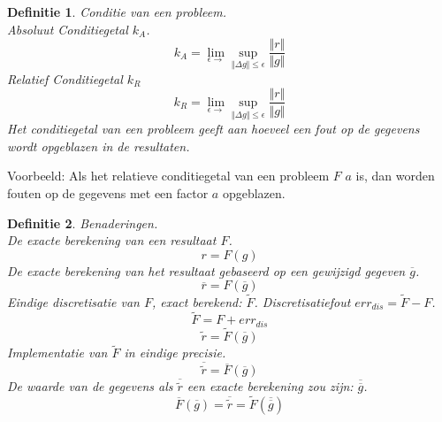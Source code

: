 \documentclass[12pt,a4paper]{article}
\newtheorem{defi}{Definitie}
\begin{document}
\begin{defi}
Conditie van een probleem.\\
Absoluut Conditiegetal $k_A$.
\[
k_A =
\lim_{\epsilon \rightarrow}\sup_{\Vert \Delta g\Vert \le \epsilon} \frac{\Vert r\Vert}{\Vert g \Vert}
\]
Relatief Conditiegetal $k_R$
\[
k_R =
\lim_{\epsilon \rightarrow}\sup_{\Vert \Delta g\Vert \le \epsilon} \frac{\Vert r\Vert}{\Vert g \Vert}
\]
Het conditiegetal van een probleem geeft aan hoeveel een fout op de gegevens wordt opgeblazen in de resultaten.
\end{defi}
\noindent Voorbeeld: Als het relatieve conditiegetal van een probleem $F$ $a$ is, dan worden fouten op de gegevens met een factor $a$ opgeblazen.
\begin{defi} Benaderingen.\\
De exacte berekening van een resultaat $F$.
\[
r = F(g)
\]
De exacte berekening van het resultaat gebaseerd op een gewijzigd gegeven $\overline{g}$.
\[
\overline{r} = F(\overline{g})
\]
Eindige discretisatie van $F$, exact berekend: $\widetilde{F}$. Discretisatiefout $err_{dis} = \widetilde{F} - F$.
\[
\widetilde{F} = F + err_{dis}
\]
\[
\widetilde{r} = \widetilde{F}(\overline{g})
\]
Implementatie van $\widetilde{F}$ in eindige precisie.
\[
\overline{\widetilde{r}} = \overline{F}(\overline{g})
\]
De waarde van de gegevens als $\overline{\widetilde{r}}$ een exacte berekening zou zijn: $\overline{\overline{g}}$.
\[
\overline{F}(\overline{g}) = \overline{\widetilde{r}} = \widetilde{F}(\overline{\overline{g}})
\]
\end{defi}
\end{document}
